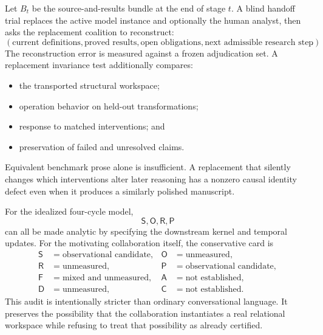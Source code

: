 
Let \(B_t\) be the source-and-results bundle at the end of stage \(t\). A blind
handoff trial replaces the active model instance and optionally the human
analyst, then asks the replacement coalition to reconstruct:
\[
\left(
\text{current definitions},
\text{proved results},
\text{open obligations},
\text{next admissible research step}
\right).
\]
The reconstruction error is measured against a frozen adjudication set. A
replacement invariance test additionally compares:
\begin{itemize}
\item the transported structural workspace;
\item operation behavior on held-out transformations;
\item response to matched interventions; and
\item preservation of failed and unresolved claims.
\end{itemize}
Equivalent benchmark prose alone is insufficient. A replacement that silently
changes which interventions alter later reasoning has a nonzero causal identity
defect even when it produces a similarly polished manuscript.


For the idealized four-cycle model,
\[
\mathsf S,\mathsf O,\mathsf R,\mathsf P
\]
can all be made analytic by specifying the downstream kernel and temporal
updates. For the motivating collaboration itself, the conservative card is
\[
\boxed{
\begin{aligned}
\mathsf S&=\text{observational candidate},
&\mathsf O&=\text{unmeasured},\\
\mathsf R&=\text{unmeasured},
&\mathsf P&=\text{observational candidate},\\
\mathsf F&=\text{mixed and unmeasured},
&\mathsf A&=\text{not established},\\
\mathsf D&=\text{unmeasured},
&\mathsf C&=\text{not established}.
\end{aligned}
}
\]
This audit is intentionally stricter than ordinary conversational language. It
preserves the possibility that the collaboration instantiates a real relational
workspace while refusing to treat that possibility as already certified.



